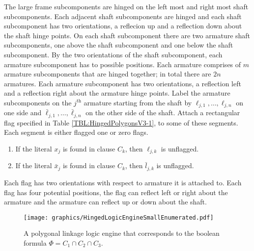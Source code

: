 \documentclass[10pt]{CSUNthesis}
\theoremstyle{plain}%
\theoremstyle{definition}
\theoremstyle{remark}
\begin{document}
The large frame subcomponents are hinged on the left most and right most shaft subcomponents. 
Each adjacent shaft subcomponents are hinged and each shaft subcomponent has two orientations, a reflecion up and a reflection down about the shaft hinge points.  
On each shaft subcomponent there are two armature shaft subcomponents, one above the shaft subcomponent and one below the shaft subcomponent.  
By the two orientations of the shaft subcomponent, each armature subcomponent has to possible positions.  
Each armature comprises of $m$ armature subcomponents that are hinged together; in total there are $2n$ armatures.  
Each armature subcomponent has two orientations, a reflection left and a reflection right about the armature hinge points.  
Label the armature subcomponents on the $j^\text{th}$ armature starting from the shaft by $\ell_{j,1},\ldots,\ell_{j,n}$ on one side and  $\bar{\ell}_{j,1},\ldots,\bar{\ell}_{j,n}$ on the other side of the shaft.  
Attach a rectangular flag specified in Table \ref{TBL:HingedPolygonsV3-1}, to some of these segments. 
Each segment is either flagged one or zero flags.
\begin{enumerate}
	 \item If the literal $x_j$ is found in clause $C_k$, then $\ell_{j,k}$ is unflagged.
	 \item If the literal $\bar{x}_j$ is found in clause $C_k$, then $\bar{l}_{j,k}$ is unflagged.
\end{enumerate}

Each flag has two orientations with respect to armature it is attached to.  Each flag has four potential positions, the flag can reflect left or right about the armature and the armature can reflect up or down about the shaft.

\begin{figure}[!htbp]
\begin{center}
\texttt{[image: graphics/HingedLogicEngineSmallEnumerated.pdf]}
\caption{A polygonal linkage logic engine that corresponds to the boolean formula $\Phi = C_1 \cap C_2 \cap C_3$.}\label{fig:HingedLogicEngineSmallEnumerated.pdf}
\end{center}
\end{figure}
\end{document}
